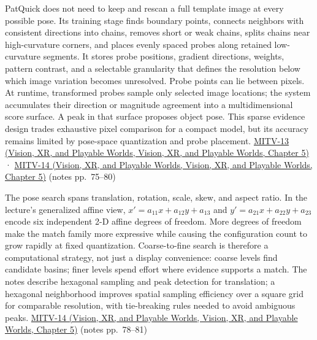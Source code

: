 PatQuick does not need to keep and rescan a full template image at every possible pose. Its training stage finds boundary points, connects neighbors with consistent directions into chains, removes short or weak chains, splits chains near high-curvature corners, and places evenly spaced probes along retained low-curvature segments. It stores probe positions, gradient directions, weights, pattern contrast, and a selectable granularity that defines the resolution below which image variation becomes unresolved. Probe points can lie between pixels. At runtime, transformed probes sample only selected image locations; the system accumulates their direction or magnitude agreement into a multidimensional score surface. A peak in that surface proposes object pose. This sparse evidence design trades exhaustive pixel comparison for a compact model, but its accuracy remains limited by pose-space quantization and probe placement. \href{../07-Vision-XR-and-Playable-Worlds/main.pdf\#nameddest=04-visual-computing-ii-ch036-mitv-13---object-detection-recognition-and-pose-determination-patquick-us-7016539}{MITV-13 (Vision, XR, and Playable Worlds, Vision, XR, and Playable Worlds, Chapter 5)} · \href{../07-Vision-XR-and-Playable-Worlds/main.pdf\#nameddest=04-visual-computing-ii-ch036-mitv-14---inspection-in-patquick-hough-transform-homography-position-determination-multi-scale}{MITV-14 (Vision, XR, and Playable Worlds, Vision, XR, and Playable Worlds, Chapter 5)} (notes pp.~75--80)

The pose search spans translation, rotation, scale, skew, and aspect ratio. In the lecture's generalized affine view, \(x'=a_{11}x+a_{12}y+a_{13}\) and \(y'=a_{21}x+a_{22}y+a_{23}\) encode six independent 2-D affine degrees of freedom. More degrees of freedom make the match family more expressive while causing the configuration count to grow rapidly at fixed quantization. Coarse-to-fine search is therefore a computational strategy, not just a display convenience: coarse levels find candidate basins; finer levels spend effort where evidence supports a match. The notes describe hexagonal sampling and peak detection for translation; a hexagonal neighborhood improves spatial sampling efficiency over a square grid for comparable resolution, with tie-breaking rules needed to avoid ambiguous peaks. \href{../07-Vision-XR-and-Playable-Worlds/main.pdf\#nameddest=04-visual-computing-ii-ch036-mitv-14---inspection-in-patquick-hough-transform-homography-position-determination-multi-scale}{MITV-14 (Vision, XR, and Playable Worlds, Vision, XR, and Playable Worlds, Chapter 5)} (notes pp.~78--81)

